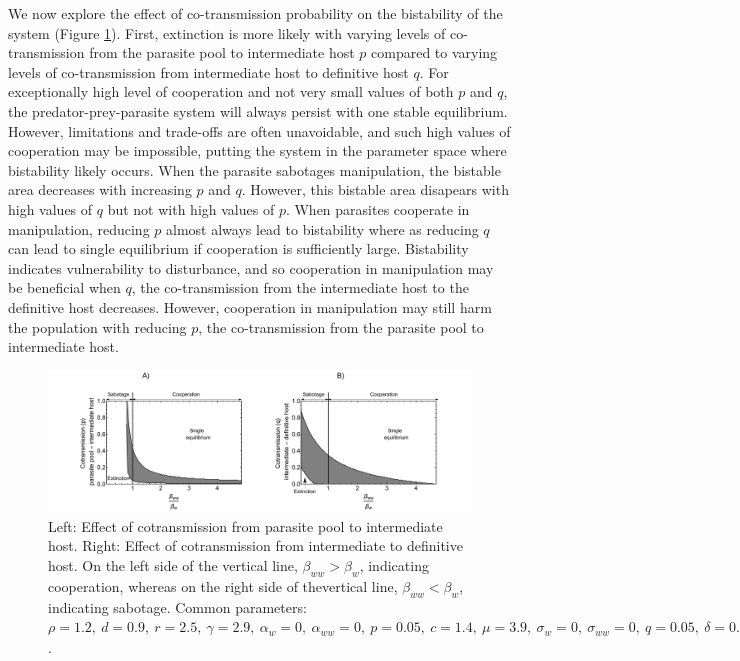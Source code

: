 \documentclass[a4paper]{scrartcl}
\begin{document}
We now explore the effect of co-transmission probability on the bistability of the system (Figure \ref{fig:contransmission}). 
First, extinction is more likely with varying levels of co-transmission from the parasite pool to intermediate host $p$ compared to varying levels of co-transmission from intermediate host to definitive host $q$. 
For exceptionally high level of cooperation and not very small  values of both $p$ and $q$, the predator-prey-parasite system will always persist with one stable equilibrium.
However, limitations and trade-offs are often unavoidable, and such high values of cooperation may be impossible, putting the system in the parameter space where bistability likely occurs.
When the parasite sabotages manipulation, the bistable area decreases with increasing $p$ and $q$. 
However, this bistable area disapears with high values of $q$ but not with high values of $p$. 
When parasites cooperate in manipulation, reducing $p$ almost always lead to bistability where as reducing $q$ can lead to single equilibrium if cooperation is sufficiently large.  
Bistability indicates vulnerability to disturbance, and so cooperation in manipulation may be beneficial when $q$, the co-transmission from the intermediate host to the definitive host decreases. 
However, cooperation in manipulation may still harm the population with reducing $p$, the co-transmission from the parasite pool to intermediate host.

\begin{figure}[!ht]
	\captionsetup{format=plain}
	\centering
	\includegraphics[width=\textwidth]{Figures/coinfect_transmission.pdf}
	\caption{Left: Effect of cotransmission from parasite pool to intermediate host. Right: Effect of cotransmission from intermediate to definitive host. On the left side of the vertical line, $\beta_{ww} > \beta_{w}$, indicating cooperation, whereas on the right side of thevertical line, $\beta_{ww} < \beta_{w}$, indicating sabotage. Common parameters:  $\rho = 1.2, \ d = 0.9, \ r = 2.5, \ \gamma = 2.9, \ \alpha_w = 0, \ \alpha_{ww} = 0, \ p = 0.05, \ c = 1.4, \ \mu = 3.9, \ \sigma_w = 0, \ \sigma_{ww} = 0, \ q = 0.05, \ \delta = 0.9, \ k = 0.26, \ \epsilon = 4.5, \ \beta_w = 1.45, \ f_w = 38, \ h = 0.6$.}
	\label{fig:contransmission}
\end{figure}
\end{document}
